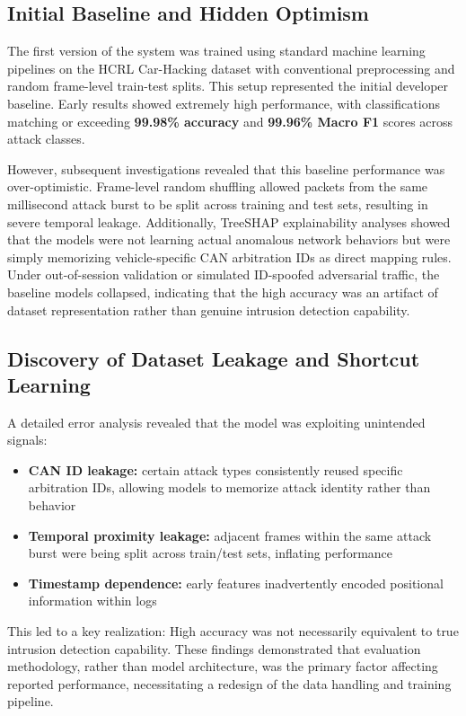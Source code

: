 \documentclass{article}
\begin{document}
\subsection{Initial Baseline and Hidden Optimism}
The first version of the system was trained using standard machine learning pipelines on the HCRL Car-Hacking dataset with conventional preprocessing and random frame-level train-test splits. This setup represented the initial developer baseline. Early results showed extremely high performance, with classifications matching or exceeding \textbf{99.98\% accuracy} and \textbf{99.96\% Macro F1} scores across attack classes.

However, subsequent investigations revealed that this baseline performance was over-optimistic. Frame-level random shuffling allowed packets from the same millisecond attack burst to be split across training and test sets, resulting in severe temporal leakage. Additionally, TreeSHAP explainability analyses showed that the models were not learning actual anomalous network behaviors but were simply memorizing vehicle-specific CAN arbitration IDs as direct mapping rules. Under out-of-session validation or simulated ID-spoofed adversarial traffic, the baseline models collapsed, indicating that the high accuracy was an artifact of dataset representation rather than genuine intrusion detection capability.

\subsection{Discovery of Dataset Leakage and Shortcut Learning}
A detailed error analysis revealed that the model was exploiting unintended signals:
\begin{itemize}[noitemsep]
    \item \textbf{CAN ID leakage:} certain attack types consistently reused specific arbitration IDs, allowing models to memorize attack identity rather than behavior
    \item \textbf{Temporal proximity leakage:} adjacent frames within the same attack burst were being split across train/test sets, inflating performance
    \item \textbf{Timestamp dependence:} early features inadvertently encoded positional information within logs
\end{itemize}
This led to a key realization:
High accuracy was not necessarily equivalent to true intrusion detection capability. These findings demonstrated that evaluation methodology, rather than model architecture, was the primary factor affecting reported performance, necessitating a redesign of the data handling and training pipeline.
\end{document}
